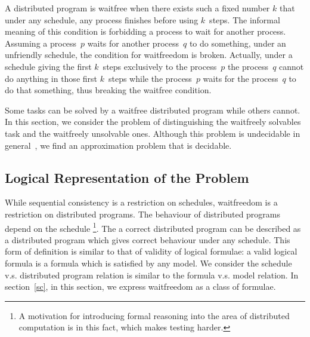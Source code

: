   A distributed program is waitfree when there exists such a fixed number $k$ that
  under any schedule,
  any process finishes before using $k$~steps.
  The informal meaning of this condition is forbidding a process to wait for another
  process.
  Assuming a process~$p$ waits for another process~$q$ to do something,
  under an unfriendly schedule, the condition for waitfreedom is broken.
  Actually, under
  a schedule giving the first $k$~steps exclusively to the process~$p$
  the process~$q$ cannot do anything in those first $k$~steps while the process~$p$ waits
  for the process~$q$ to do that something, thus breaking the waitfree condition.

  Some tasks can be solved by a waitfree distributed program while others cannot.
  In this section, we consider the problem of
  distinguishing the waitfreely solvables task and the waitfreely unsolvable ones.
  Although this problem is undecidable in general~\cite{gafni1999three},
  we find an approximation problem that is decidable.

  \subsection{Logical Representation of the Problem}

  While sequential consistency is a restriction on schedules,
  waitfreedom is a restriction on distributed programs.
  The behaviour of distributed programs depend on the schedule%
  \footnote{A motivation for introducing formal reasoning into the area of distributed
  computation is in this fact, which makes testing harder.}.
  The a correct distributed program can be described as
  a distributed program which gives correct behaviour under any schedule.
  This form of definition is similar to that of validity of logical formulae:
  a valid logical formula is a formula which is satisfied by any model.
  We consider the schedule v.s. distributed program relation is similar to
  the formula v.s. model relation.
  In section~\ref{sc},
  in this section, we express waitfreedom as a class of formulae.

